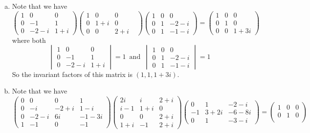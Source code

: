 \documentclass[a4paper, 12pt]{article}
\begin{document}
\begin{solution}
\begin{enumerate}[(a)]
\item Note that we have 
\[\begin{pmatrix}
	1&0&0\\ 
	0&-1&1\\ 
	0&-2-i&1+i
\end{pmatrix}\begin{pmatrix}
	1&0&0\\ 
	0&1+i&0\\ 
	0&0&2+i&
\end{pmatrix}\begin{pmatrix}
	1&0&0\\ 
	0&1&-2-i\\ 
	0&1&-1-i
\end{pmatrix}=\begin{pmatrix}
	1&0&0\\ 
	0&1&0\\ 
	0&0&1+3i
\end{pmatrix}\]
where both 
\[\begin{vmatrix}
	1&0&0\\ 
	0&-1&1\\ 
	0&-2-i&1+i
\end{vmatrix}=1\,\,\, \text{and}\,\,\, \begin{vmatrix}
	1&0&0\\ 
	0&1&-2-i\\ 
	0&1&-1-i
\end{vmatrix}=1\]
So the invariant factors of this matrix is \((1,1,1+3i)\).
\item Note that we have 
\[\begin{pmatrix}
	0&0&0&1\\ 
	0&-i&-2+i&1-i\\ 
	0&-2-i&6i&-1-3i\\ 
	1&-1&0&-1
\end{pmatrix}\begin{pmatrix}
	2i&i&2+i\\ 
	i-1&1+i&0\\
	0&0&2+i\\ 
	1+i&-1&2+i
\end{pmatrix}\begin{pmatrix}
	0&1&-2-i\\ 
	-1&3+2i&-6-8i\\ 
	0&1&-3-i
\end{pmatrix}=\begin{pmatrix}
	1&0&0\\ 
	0&1&0\\ 

\end{pmatrix}\]
\end{enumerate}
\end{solution}
\end{document}

